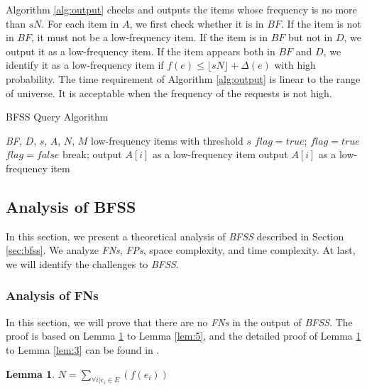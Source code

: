 \documentclass[conference]{IEEEtran}
\begin{document}
Algorithm \ref{alg:output} checks and outputs the items whose frequency is no more than $sN$. For each item in $A$, we first check whether it is in $BF$. If the item is not in $BF$, it must not be a low-frequency item. If the item is in $BF$ but not in $D$, we output it as a low-frequency item. If the item appears both in $BF$ and $D$, we identify it as a low-frequency item if $f(e)\leq\lfloor sN\rfloor+\Delta(e)$ with high probability. The time requirement of Algorithm \ref{alg:output} is linear to the range of universe. It is acceptable when the frequency of the requests is not high. 

\begin{algorithm}[h]
	\caption{BFSS Query Algorithm}
	\label{alg:output}
	\begin{algorithmic}[1]
		\REQUIRE \emph{BF}, $D$, $s$, $A$, $N$, $M$
		\ENSURE low-frequency items with threshold $s$
		\STATE $flag=true$; 
		\STATE $flag=true$
		\STATE $flag=false$
		\STATE break;
		\ENDIF
		\ENDFOR
		\STATE output $A[i]$ as a low-frequency item
		\ENDIF
		\ELSE
		\STATE output $A[i]$ as a low-frequency item
		\ENDIF
		\ENDIF
		\ENDFOR
	\end{algorithmic}
\end{algorithm}
\subsection{Analysis of BFSS}
In this section, we present a theoretical analysis of \emph{BFSS} described in Section \ref{sec:bfss}. We analyze \emph{FNs}, \emph{FPs}, space complexity, and time complexity. At last, we will identify the challenges to \emph{BFSS}. \par

\subsubsection{\textbf{Analysis of FNs}}
In this section, we will prove that there are no \emph{FNs} in the output of \emph{BFSS}. The proof is based on Lemma \ref{lem:1} to Lemma \ref{lem:5}, and the detailed proof of Lemma \ref{lem:1} to Lemma \ref{lem:3} can be found in \cite{IEEEexample:spacesaving}.\par

\newtheorem{lemma}{Lemma}
\begin{lemma}\label{lem:1}
  $N=\sum_{\forall i|e_i \in E}(f(e_i))$
\end{lemma}
\end{document}
